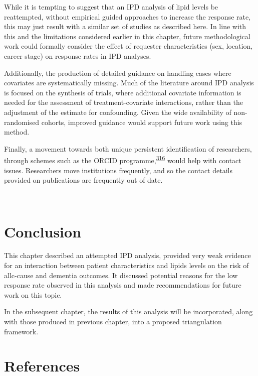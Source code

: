 \documentclass[a4paper, twoside]{templates/ociamthesis}
\begin{document}
While it is tempting to suggest that an IPD analysis of lipid levels be reattempted, without empirical guided approaches to increase the response rate, this may just result with a similar set of studies as described here. In line with this and the limitations considered earlier in this chapter, future methodological work could formally consider the effect of requester characteristics (sex, location, career stage) on response rates in IPD analyses.

Additionally, the production of detailed guidance on handling cases where covariates are systematically missing. Much of the literature around IPD analysis is focused on the synthesis of trials, where additional covariate information is needed for the assessment of treatment-covariate interactions, rather than the adjustment of the estimate for confounding. Given the wide availability of non-randomised cohorts, improved guidance would support future work using this method.

Finally, a movement towards both unique persistent identification of researchers, through schemes such as the ORCID programme,\textsuperscript{\protect\hyperlink{ref-nature2009}{316}} would help with contact issues. Researchers move institutions frequently, and so the contact details provided on publications are frequently out of date.

~

\hypertarget{conclusion}{%
\section{Conclusion}\label{conclusion}}

This chapter described an attempted IPD analysis, provided very weak evidence for an interaction between patient characteristics and lipids levels on the risk of allc-cause and dementia outcomes. It discussed potential reasons for the low response rate observed in this analysis and made recommendations for future work on this topic.

In the subsequent chapter, the results of this analysis will be incorporated, along with those produced in previous chapter, into a proposed triangulation framework.

\newpage

\hypertarget{references-4}{%
\section{References}\label{references-4}}
\end{document}
